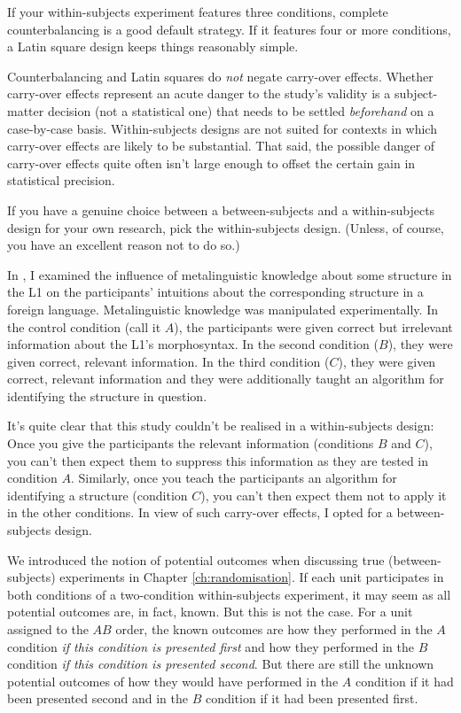   If your within-subjects experiment features three conditions,
  complete counterbalancing is a good default strategy.
  If it features four or more conditions,
  a Latin square design keeps things reasonably simple.
\parend

Counterbalancing and Latin squares do \emph{not} negate carry-over effects.
Whether carry-over effects represent an acute danger to the study's
validity is a subject-matter decision (not a statistical one)
that needs to be settled \emph{beforehand} on a case-by-case basis.
Within-subjects designs are not suited for contexts in which carry-over effects
are likely to be substantial.
That said, the possible danger of carry-over effects quite often isn't
large enough to offset the certain gain in statistical precision.

\begin{framed}
If you have a genuine choice between a between-subjects
and a within-subjects design for your own research, pick the 
within-subjects design. (Unless, of course, you have an excellent
reason not to do so.)
\end{framed}

  In \citet{Vanhove2018}, I examined the influence of metalinguistic knowledge
  about some structure in the L1 on the participants' intuitions about 
  the corresponding structure in a foreign language.
  Metalinguistic knowledge was manipulated experimentally.
  In the control condition (call it $A$), the participants were 
  given correct but irrelevant information about the L1's morphosyntax.
  In the second condition ($B$), they were given correct, relevant information.
  In the third condition ($C$), they were given correct, relevant information
  and they were additionally taught an algorithm for identifying the structure in question.
  
  It's quite clear that this study couldn't be realised in a within-subjects design:
  Once you give the participants the relevant information (conditions $B$ and $C$), 
  you can't then expect them to suppress this information as they are tested in condition $A$.
  Similarly, once you teach the participants an algorithm for identifying a structure (condition $C$),
  you can't then expect them not to apply it in the other conditions.
  In view of such carry-over effects,
  I opted for a between-subjects design.
\parend

  We introduced the notion of potential outcomes when discussing 
  true (between-subjects) experiments in Chapter \ref{ch:randomisation}.
  If each unit participates in both conditions of a two-condition within-subjects
  experiment, it may seem as all potential outcomes are, in fact, known.
  But this is not the case.
  For a unit assigned to the $AB$ order, the known outcomes are how they
  performed in the $A$ condition \emph{if this condition is presented first}
  and how they performed in the $B$ condition \emph{if this condition is presented second}.
  But there are still the unknown potential outcomes of how they would have performed
  in the $A$ condition if it had been presented second and in the $B$ condition
  if it had been presented first.
\parend

